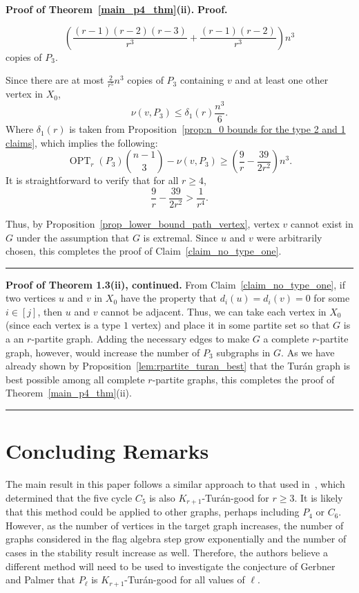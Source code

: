 \documentclass[12pt]{article}
\DeclareMathOperator{\OPT}{OPT}
\renewenvironment{proof}[1][Proof]{\textbf{#1.} }{\ \rule{0.5em}{0.5em}}
\begin{document}
\begin{proof}[Proof of Theorem~\ref{main_p4_thm}(ii)]
\begin{proof}
\begin{enumerate}
    \[ \left( \frac{(r-1)(r-2)(r-3)}{r^3} + \frac{(r-1)(r-2)}{r^3} \right)n^3 \]
    copies of $P_3$. 
\end{enumerate}
Since there are at most $\frac{2}{r^5}n^3$ copies of $P_3$ containing $v$ and at least one other vertex in $X_0$, 
\[ \nu(v,P_3) \leq \delta_1(r)\frac{n^3}{6}.\]
Where $\delta_1(r)$ is taken from Proposition~\ref{prop:n_0 bounds for the type 2 and 1 claims}, which implies the following:
\[
    \OPT_r(P_3) \binom{n-1}{3} - \nu(v,P_3) \geq \left(\frac{9}{r} - \frac{39}{2r^2} \right)n^3.
\]
It is straightforward to verify that for all $r  \geq  4$,
\[ 
\frac{9}{r} - \frac{39}{2r^2} > \frac{1}{r^4}.
\]

Thus, by Proposition~\ref{prop_lower_bound_path_vertex}, vertex $v$ cannot exist in $G$ under the assumption that $G$ is extremal. Since $u$ and $v$ were arbitrarily chosen, this completes the proof of Claim~\ref{claim_no_type_one}. 
\end{proof}


\textbf{Proof of Theorem 1.3(ii), continued.} From
Claim~\ref{claim_no_type_one}, if two vertices $u$ and $v$ in $X_0$ have the property
that $d_i(u) = d_i(v) = 0$ for some $i \in [j]$, then $u$ and $v$ cannot be
adjacent. Thus, we can take each vertex in $X_0$ (since each vertex is a type
$1$ vertex) and place it in some partite set so that $G$ is a an $r$-partite
graph. Adding the necessary edges to make $G$ a complete $r$-partite graph,
however, would increase the number of $P_3$ subgraphs in $G$. As we have already
shown by Proposition~\ref{lem:rpartite_turan_best} that the Tur\'{a}n graph is
best possible among all complete $r$-partite graphs, this completes the proof of
Theorem~\ref{main_p4_thm}(ii).
\end{proof}

\section{Concluding Remarks}\label{sec:conclusion}

The main result in this paper follows a similar approach to that used
in~\cite{lidick2020maximizing}, which determined that the five cycle $C_5$ is
also $K_{r+1}$-Tur\'an-good for $r \ge 3$. It is likely that this method
could be applied to other graphs, perhaps including $P_4$ or $C_6$. However, as
the number of vertices in the target graph increases, the number of graphs
considered in the flag algebra step grow exponentially and the number of cases
in the stability result increase as well. 
Therefore, the authors believe
a different method will need to be used to
investigate the conjecture of Gerbner and Palmer that $P_{\ell}$ is
$K_{r+1}$-Tur\'{a}n-good for all values of $\ell$.
\end{document}
